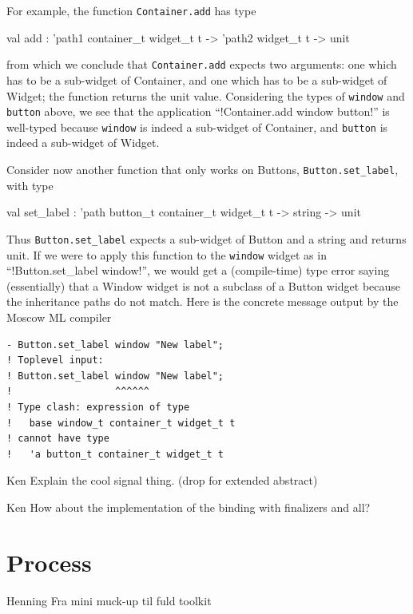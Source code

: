\documentclass[workingdraft]{usetex-v1}
\begin{document}
For example, the function \texttt{Container.add} has type
\begin{SMLcode}
val add : 'path1 container_t widget_t t
             -> 'path2 widget_t t -> unit
\end{SMLcode}
from which we conclude that \texttt{Container.add} expects two arguments:
one which has to be a sub-widget of Container, and one which has to be
a sub-widget of Widget; the function returns the unit value. Considering
the types of \texttt{window} and \texttt{button} above, we see that
the application
%
``!Container.add window button!''
%
is well-typed because \texttt{window} is indeed a sub-widget of 
Container, and \texttt{button} is indeed a sub-widget of Widget.

Consider now another function that only works on Buttons, \texttt{Button.set\_label}, with type
\begin{SMLcode}
val set_label :
    'path button_t container_t widget_t t
                        -> string -> unit
\end{SMLcode}
Thus \texttt{Button.set\_label} expects a sub-widget of Button and a string and returns unit.
If we were to apply this function to the \texttt{window} widget as in
%
``!Button.set_label window!'',
%
we would get a (compile-time) type error saying (essentially) that
a Window widget is not a subclass of a Button widget because the
inheritance paths do not match. Here is the concrete message output
by the Moscow ML compiler
\begin{verbatim}
- Button.set_label window "New label";
! Toplevel input:
! Button.set_label window "New label";
!                  ^^^^^^
! Type clash: expression of type
!   base window_t container_t widget_t t
! cannot have type
!   'a button_t container_t widget_t t
\end{verbatim}

\begin{ednote}{Ken}
  Explain the cool signal thing.
  (drop for extended abstract)
\end{ednote}

\begin{ednote}{Ken}
  How about the implementation of the binding with finalizers and all?
\end{ednote}


\section{Process}
\label{sec:process}

\begin{ednote}{Henning}
  Fra mini muck-up til fuld toolkit
\end{ednote}
\end{document}
